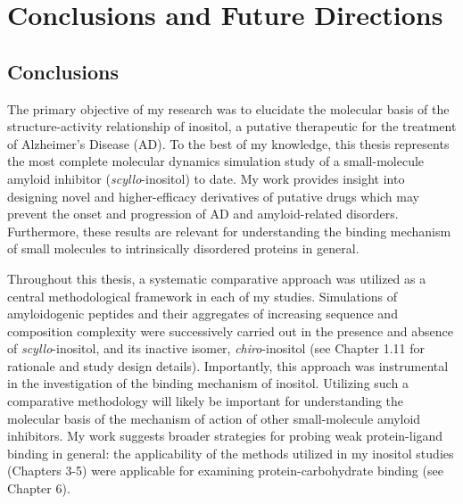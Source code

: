 

\chapter{Conclusions and Future Directions}
\section{Conclusions}

The primary objective of my research was to elucidate the molecular basis of the structure-activity relationship of inositol, a putative therapeutic for the treatment of Alzheimer's Disease (AD). To the best of my knowledge, this thesis represents the most complete molecular dynamics simulation study of a small-molecule amyloid inhibitor (\textit{scyllo}-inositol) to date. My work provides insight into designing novel and higher-efficacy derivatives of putative drugs which may prevent the onset and progression of AD and amyloid-related disorders.  Furthermore, these results are relevant for understanding the binding mechanism of small molecules to intrinsically disordered proteins in general.

Throughout this thesis, a systematic comparative approach was utilized as a central methodological framework in each of my studies. Simulations of amyloidogenic peptides and their aggregates of increasing sequence and composition complexity were successively carried out in the presence and absence of \emph{scyllo}-inositol, and its inactive isomer, \emph{chiro}-inositol (see Chapter 1.11 for rationale and study design details). Importantly, this approach was instrumental in the investigation of the binding mechanism of inositol. Utilizing such a comparative methodology will likely be important for understanding the molecular basis of the mechanism of action of other small-molecule amyloid inhibitors. My work suggests broader strategies for probing weak protein-ligand binding in general: the applicability of the methods utilized in my inositol studies (Chapters 3-5) were applicable for examining protein-carbohydrate binding (see Chapter 6).

